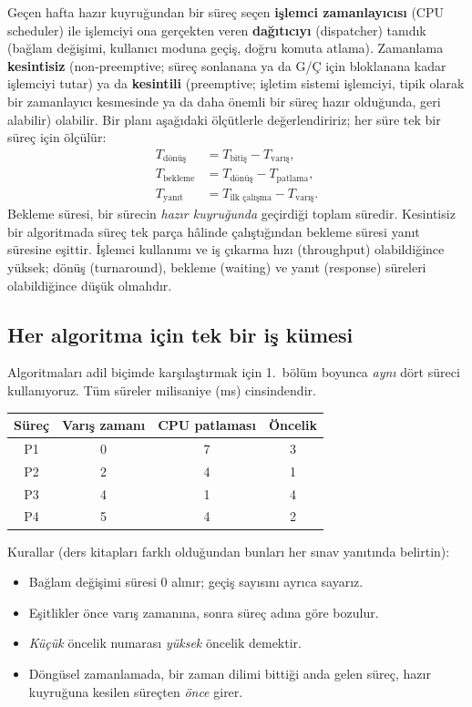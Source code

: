 \documentclass[11pt,a4paper]{article}
\newcommand{\term}[1]{\textbf{\color{mintdeep}#1}}
\begin{document}
Geçen hafta hazır kuyruğundan bir süreç seçen \term{işlemci zamanlayıcısı} (CPU scheduler) ile işlemciyi ona gerçekten veren \term{dağıtıcıyı} (dispatcher) tanıdık (bağlam değişimi, kullanıcı moduna geçiş, doğru komuta atlama). Zamanlama \term{kesintisiz} (non-preemptive; süreç sonlanana ya da G/Ç için bloklanana kadar işlemciyi tutar) ya da \term{kesintili} (preemptive; işletim sistemi işlemciyi, tipik olarak bir zamanlayıcı kesmesinde ya da daha önemli bir süreç hazır olduğunda, geri alabilir) olabilir. Bir planı aşağıdaki ölçütlerle değerlendiririz; her süre tek bir süreç için ölçülür:
\begin{align*}
T_{\text{dönüş}} &= T_{\text{bitiş}} - T_{\text{varış}},\\
T_{\text{bekleme}} &= T_{\text{dönüş}} - T_{\text{patlama}},\\
T_{\text{yanıt}} &= T_{\text{ilk çalışma}} - T_{\text{varış}}.
\end{align*}
Bekleme süresi, bir sürecin \emph{hazır kuyruğunda} geçirdiği toplam süredir. Kesintisiz bir algoritmada süreç tek parça hâlinde çalıştığından bekleme süresi yanıt süresine eşittir. İşlemci kullanımı ve iş çıkarma hızı (throughput) olabildiğince yüksek; dönüş (turnaround), bekleme (waiting) ve yanıt (response) süreleri olabildiğince düşük olmalıdır.

\subsection{Her algoritma için tek bir iş kümesi}
\label{sec:jobs}

Algoritmaları adil biçimde karşılaştırmak için 1.~bölüm boyunca \emph{aynı} dört süreci kullanıyoruz. Tüm süreler milisaniye (ms) cinsindendir.

\begin{center}
\renewcommand{\arraystretch}{1.25}
\begin{tabular}{@{}cccc@{}}
\toprule
\textbf{Süreç} & \textbf{Varış zamanı} & \textbf{CPU patlaması} & \textbf{Öncelik} \\
\midrule
P1 & 0 & 7 & 3 \\
P2 & 2 & 4 & 1 \\
P3 & 4 & 1 & 4 \\
P4 & 5 & 4 & 2 \\
\bottomrule
\end{tabular}
\end{center}

Kurallar (ders kitapları farklı olduğundan bunları her sınav yanıtında belirtin):
\begin{itemize}
  \item Bağlam değişimi süresi $0$ alınır; geçiş sayısını ayrıca sayarız.
  \item Eşitlikler önce varış zamanına, sonra süreç adına göre bozulur.
  \item \emph{Küçük} öncelik numarası \emph{yüksek} öncelik demektir.
  \item Döngüsel zamanlamada, bir zaman dilimi bittiği anda gelen süreç, hazır kuyruğuna kesilen süreçten \emph{önce} girer.
\end{itemize}
\end{document}
